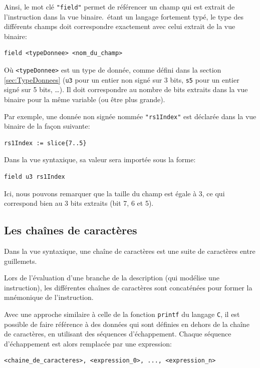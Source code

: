  Ainsi, le mot clé {\tt "field"} permet de référencer un champ qui est extrait de l'instruction dans la vue binaire.\harmless\ étant un langage fortement typé, le type des différents champs doit correspondre exactement avec celui extrait de la vue binaire:

\begin{lstlisting}
field <typeDonnee> <nom_du_champ>
\end{lstlisting}

Où {\tt <typeDonnee>} est un type de donnée, comme défini dans la section \ref{sec:TypeDonnees} (\texttt{u3} pour un entier non signé sur 3 bits, \texttt{s5} pour un entier signé sur 5 bits, \ldots). Il doit correspondre au nombre de bits extraits dans la vue binaire pour la même variable (ou être plus grande).

Par exemple, une donnée non signée nommée {\tt "rs1Index"} est déclarée dans la vue binaire de la façon suivante:

\begin{lstlisting}
rs1Index := slice{7..5}
\end{lstlisting}

Dans la vue syntaxique, sa valeur sera importée sous la forme:

\begin{lstlisting}
field u3 rs1Index
\end{lstlisting}

Ici, nous pouvons remarquer que la taille du champ est égale à 3, ce qui correspond bien au 3 bits extraits (bit 7, 6 et 5).

\subsection{Les  chaînes de caractères}
\label{sec:syntaxChaineCaract}
Dans la vue syntaxique, une chaîne de caractères est une suite de caractères entre guillemets. 

Lors de l'évaluation d'une branche de la description (qui modélise une instruction), les différentes chaînes de caractères sont concaténées pour former la mnémonique de l'instruction.

Avec une approche similaire à celle de la fonction \texttt{printf} du langage \texttt{C}, il est possible de faire référence à des données qui sont définies en dehors de la chaîne de caractères, en utilisant des séquences d'échappement. Chaque séquence d'échappement est alors remplacée par une expression:

\begin{lstlisting}
<chaine_de_caracteres>, <expression_0>, ..., <expression_n>
\end{lstlisting}

